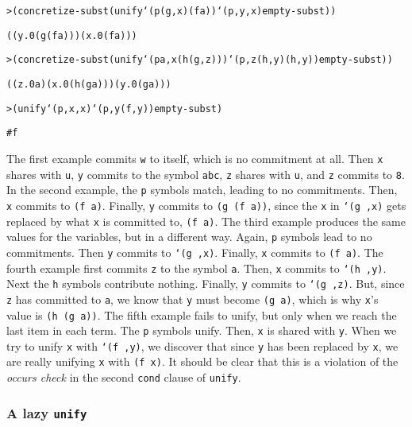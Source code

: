 \begin{alltt}
> (concretize-subst (unify `(p (g ,x) (f a)) `(p ,y ,x) empty-subst))

((y.0 (g (f a))) (x.0 (f a)))
\end{alltt}

\begin{alltt}
> (concretize-subst (unify `(p a ,x (h (g ,z))) `(p ,z (h ,y) (h ,y)) empty-subst))

((z.0 a) (x.0 (h (g a))) (y.0 (g a)))
\end{alltt}

\begin{alltt}
> (unify `(p ,x ,x) `(p ,y (f ,y)) empty-subst)

#f
\end{alltt}

\noindent
The first example commits \texttt{w} to itself, which is no commitment
at all.  Then \texttt{x} shares with \texttt{u}, \texttt{y} commits to
the symbol \texttt{abc}, \texttt{z} shares with \texttt{u}, and
\texttt{z} commits to \texttt{8}.  In the second example, the
\texttt{p} symbols match, leading to no commitments.  Then, \texttt{x}
commits to \texttt{(f a)}.  Finally, \texttt{y} commits to \texttt{(g
(f a))}, since the \texttt{x} in \texttt{`(g ,x)} gets replaced by
what \texttt{x} is committed to, \texttt{(f a)}.  The third example
produces the same values for the variables, but in a different way.
Again, \texttt{p} symbols lead to no commitments.  Then \texttt{y}
commits to \texttt{`(g ,x)}. Finally, \texttt{x} commits to \texttt{(f
a)}.  The fourth example first commits \texttt{z} to the symbol
\texttt{a}.  Then, \texttt{x} commits to \texttt{`(h ,y)}. Next the
\texttt{h} symbols contribute nothing.  Finally, \texttt{y} commits to
\texttt{`(g ,z)}.  But, since \texttt{z} has committed to \texttt{a},
we know that \texttt{y} must become \texttt{(g a)}, which is why
\texttt{x}'s value is \texttt{(h (g a))}.  The fifth example fails to
unify, but only when we reach the last item in each term.  The
\texttt{p} symbols unify.  Then, \texttt{x} is shared with \texttt{y}.
When we try to unify \texttt{x} with \texttt{`(f ,y)}, we discover
that since \texttt{y} has been replaced by \texttt{x}, we are really
unifying \texttt{x} with \texttt{(f x)}.  It should be clear that this
is a violation of the \emph{occurs check} in the second \texttt{cond}
clause of \texttt{unify}.

\subsubsection{A lazy \texttt{unify}}


